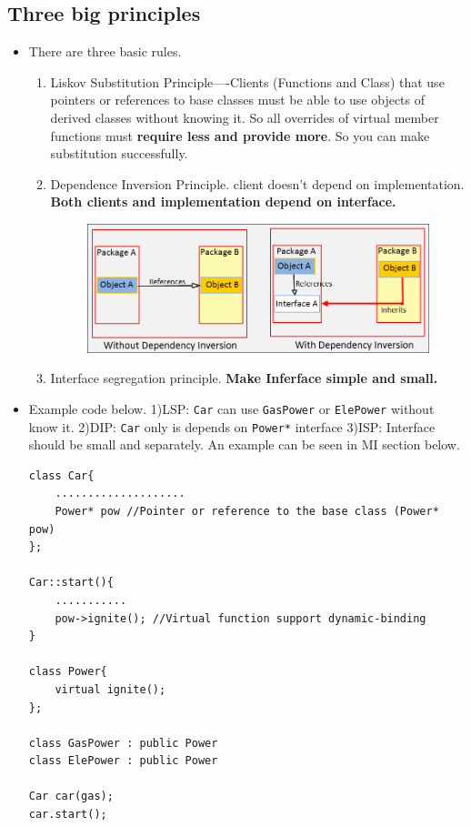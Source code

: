 \documentclass[a4paper,11pt,twoside]{book}
\begin{document}
\subsection{Three big principles}
\begin{itemize}
	\item There are three basic rules.
\begin{enumerate}
	\item Liskov Substitution Principle----Clients (Functions and Class) that use pointers or references to base classes must be able to use objects of derived classes without knowing it.  So all overrides of virtual member functions must \textbf{require less and provide more}. So you can make substitution successfully.
	
	\item Dependence Inversion Principle. client doesn't depend on implementation. \textbf{Both clients and implementation depend on interface.}
	\begin{figure}[h]
		\centering
		\includegraphics[width=0.7\linewidth]{pics/DIP.png}
		\label{fig:dip}
	\end{figure}
	
	\item Interface segregation principle. \textbf{Make Inferface simple and small.}
\end{enumerate}

\item Example code below.  1)LSP: \texttt{Car} can use  \texttt{GasPower} or \texttt{ElePower} without know it. 2)DIP: \texttt{Car} only is depends on \texttt{Power*} interface 3)ISP: Interface should be small and separately. An example can be seen in MI section below.

\begin{lstlisting}
class Car{
	....................
	Power* pow //Pointer or reference to the base class (Power* pow)
};

Car::start(){
	...........
	pow->ignite(); //Virtual function support dynamic-binding
}

class Power{
	virtual ignite();
};

class GasPower : public Power
class ElePower : public Power

Car car(gas);
car.start();
\end{lstlisting}

\end{itemize}
\end{document}
